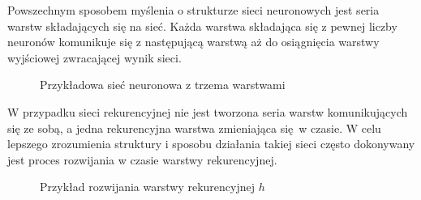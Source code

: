 \documentclass[10pt,a4paper]{article}
\begin{document}
Powszechnym sposobem myślenia o strukturze sieci neuronowych jest seria warstw składających się na sieć. Każda warstwa składająca się z pewnej liczby neuronów komunikuje się z następującą warstwą aż do osiągnięcia warstwy wyjściowej zwracającej wynik sieci. 
\begin{figure}[!ht]
	\centering
	\caption{Przykładowa sieć neuronowa z trzema warstwami}
\end{figure}
\FloatBarrier

W przypadku sieci rekurencyjnej nie jest tworzona seria warstw komunikujących się ze sobą, a jedna rekurencyjna warstwa zmieniająca się w czasie. W celu lepszego zrozumienia struktury i sposobu działania takiej sieci często dokonywany jest proces rozwijania w czasie warstwy rekurencyjnej.

\begin{figure}[!ht]
	\centering
	\caption{Przykład rozwijania warstwy rekurencyjnej $h$}
\end{figure}
\FloatBarrier
\end{document}
